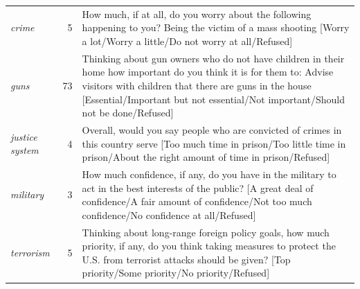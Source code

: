 \begin{table}[!h]
\begin{center}
\begin{small}
\begin{tabular}{p{4.5cm}rp{10.5cm}}
            \textit{crime} & 5 & How much, if at all, do you worry about the following happening to you? Being the victim of a mass shooting [Worry a lot/Worry a little/Do not worry at all/Refused] \\
            \textit{guns} & 73 & Thinking about gun owners who do not have children in their home how important do you think it is for them to: Advise visitors with children that there are guns in the house [Essential/Important but not essential/Not important/Should not be done/Refused] \\  
            \textit{justice system} & 4 & Overall, would you say people who are convicted of crimes in this country serve [Too much time in prison/Too little time in prison/About the right amount of time in prison/Refused] \\
            \textit{military} & 3 & How much confidence, if any, do you have in the military to act in the best interests of the public? [A great deal of confidence/A fair amount of confidence/Not too much confidence/No confidence at all/Refused] \\
            \textit{terrorism} & 5 & Thinking about long-range foreign policy goals, how much priority, if any, do you think taking measures to protect the U.S. from terrorist attacks should be given? [Top priority/Some priority/No priority/Refused] \\  
           \bottomrule
        \end{tabular}
\end{small}
\end{center}    
\vskip -0.1in
\end{table}
    
